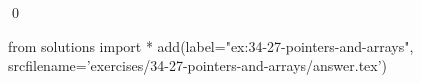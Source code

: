 
\begin{ex}
  \label{ex:34-27-pointers-and-arrays}
  
  \qed
\end{ex}
\begin{python0}
from solutions import *
add(label="ex:34-27-pointers-and-arrays",
    srcfilename='exercises/34-27-pointers-and-arrays/answer.tex')
\end{python0}
